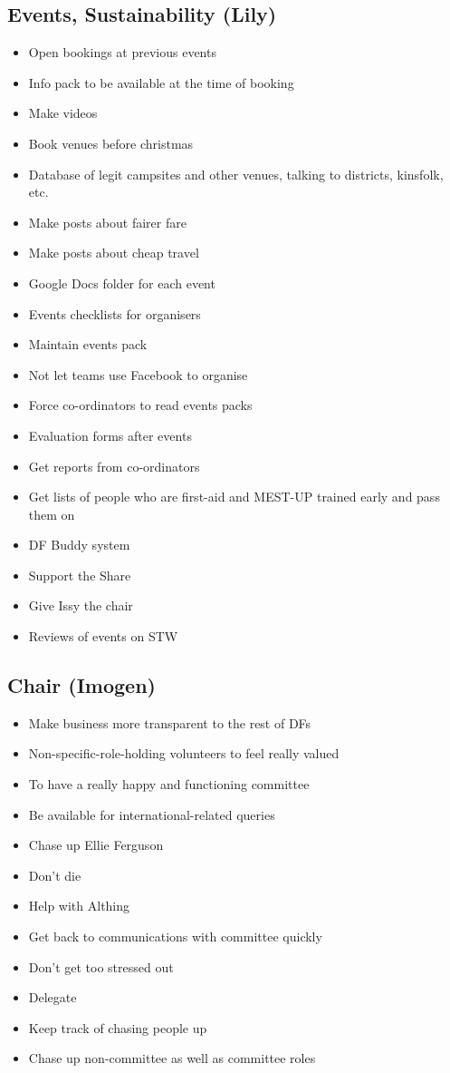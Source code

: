 \documentclass[a4paper, 11pt]{article} %
\begin{document}
\subsection{Events, Sustainability (Lily)}
\begin{itemize}
	\item Open bookings at previous events
	\item Info pack to be available at the time of booking
	\item Make videos
	\item Book venues before christmas
	\item Database of legit campsites and other venues, talking to districts, kinsfolk, etc.
	\item Make posts about fairer fare
	\item Make posts about cheap travel
	\item Google Docs folder for each event
	\item Events checklists for organisers
	\item Maintain events pack
	\item Not let teams use Facebook to organise
	\item Force co-ordinators to read events packs
	\item Evaluation forms after events
	\item Get reports from co-ordinators
	\item Get lists of people who are first-aid and MEST-UP trained early and pass them on
	\item DF Buddy system
	\item Support the Share
	\item Give Issy the chair
	\item Reviews of events on STW
\end{itemize}

\subsection{Chair (Imogen)}
\begin{itemize}
	\item Make business more transparent to the rest of DFs
	\item Non-specific-role-holding volunteers to feel really valued
	\item To have a really happy and functioning committee
	\item Be available for international-related queries
	\item Chase up Ellie Ferguson
	\item Don't die
	\item Help with Althing
	\item Get back to communications with committee quickly
	\item Don't get too stressed out
	\item Delegate
	\item Keep track of chasing people up
	\item Chase up non-committee as well as committee roles
\end{itemize}
\end{document}

